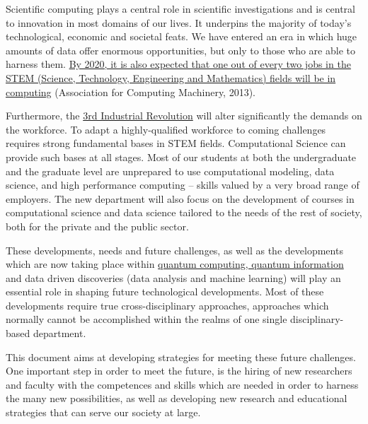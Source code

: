 \documentclass[%
oneside,                 %
final,                   %
10pt]{article}
\begin{document}
Scientific computing plays a central role in scientific investigations
and is central to innovation in most domains of our lives. It
underpins the majority of today's technological, economic and societal
feats. We have entered an era in which huge amounts of data offer
enormous opportunities, but only to those who are able to harness
them.  \href{{http://pathways.acm.org/executive-summary.html}}{By 2020, it is also expected that one out of every two jobs in
the STEM (Science, Technology, Engineering and Mathematics) fields
will be in computing}
(Association for Computing Machinery, 2013).

Furthermore, the \href{{http://www.economist.com/node/21553017}}{3rd Industrial Revolution} will alter significantly the demands on the workforce. To adapt a highly-qualified workforce to coming challenges  requires strong fundamental bases in STEM fields. Computational Science can provide such bases at all stages. Most of our students at both the undergraduate and the graduate level are unprepared to use computational modeling, data science, and high performance computing – skills valued by a very broad range of employers. The new department will also focus on the development of courses in computational science and data science tailored to the needs of the rest of society, both for the private and the public sector.

These developments, needs and future challenges, as well as
the developments which are now taking place within \href{{https://www.aps.org/publications/apsnews/201802/ostp.cfm?utm_source=APS+Physics+Main+Group&utm_campaign=fb7a2e7d6b-News+021218&utm_medium=email&utm_term=0_825303224b-fb7a2e7d6b-106513221}}{quantum computing, quantum information} and data driven discoveries (data analysis and machine learning) will play an essential role in shaping future technological developments. Most of these developments require true cross-disciplinary approaches, approaches which normally cannot be accomplished within the realms of one single disciplinary-based department. 


This document aims at developing strategies for meeting
these future challenges.  One important step in order to meet the
future, is the hiring of new researchers and faculty with the
competences and skills which are needed in order to harness the many
new possibilities, as well as developing new research and educational
strategies that can serve our society at large.




\vspace{6mm}
\end{document}
